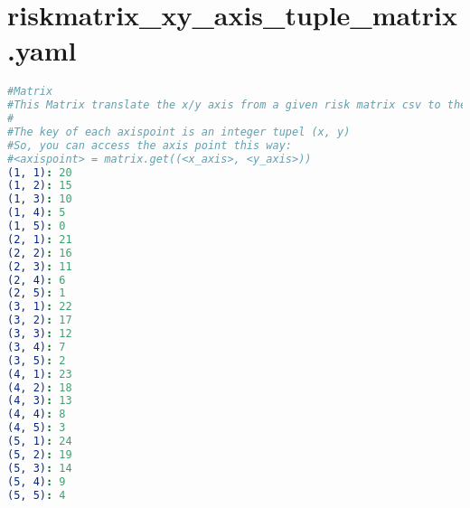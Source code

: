 
\section{riskmatrix\_xy\_axis\_tuple\_matrix.yaml}
\lstset{style=gra_codestyle}
\begin{lstlisting}[language=yaml, caption=Python LaTex - riskmatrix\_xy\_axis\_tuple\_matrix.yaml - Konfigurationsdatei - Risikomatrizen - X-Y-Achsen Tuples,captionpos=b,label={lst:riskmatrix_xy_axis_tuple_matrix},breaklines=true]
#Matrix
#This Matrix translate the x/y axis from a given risk matrix csv to the axispoint.
#
#The key of each axispoint is an integer tupel (x, y)
#So, you can access the axis point this way:
#<axispoint> = matrix.get((<x_axis>, <y_axis>))
(1, 1): 20
(1, 2): 15
(1, 3): 10
(1, 4): 5
(1, 5): 0
(2, 1): 21
(2, 2): 16
(2, 3): 11
(2, 4): 6
(2, 5): 1
(3, 1): 22
(3, 2): 17
(3, 3): 12
(3, 4): 7
(3, 5): 2
(4, 1): 23
(4, 2): 18
(4, 3): 13
(4, 4): 8
(4, 5): 3
(5, 1): 24
(5, 2): 19
(5, 3): 14
(5, 4): 9
(5, 5): 4
\end{lstlisting}
